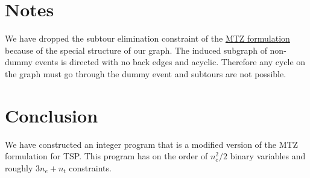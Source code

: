 \documentclass[11pt]{article}
\begin{document}
\section{Notes}
We have dropped the subtour elimination constraint of the \href{https://en.wikipedia.org/wiki/Travelling_salesman_problem#Miller%E2%80%93Tucker%E2%80%93Zemlin_formulation}{MTZ formulation} because of the special structure of our graph. The induced subgraph of non-dummy events is directed with no back edges and acyclic. Therefore any cycle on the graph must go through the dummy event and subtours are not possible.

\section{Conclusion}
We have constructed an integer program that is a modified version of the MTZ formulation for TSP. This program has on the order of $n_e^2 / 2$ binary variables and roughly $3n_e + n_t$ constraints.
\end{document}
